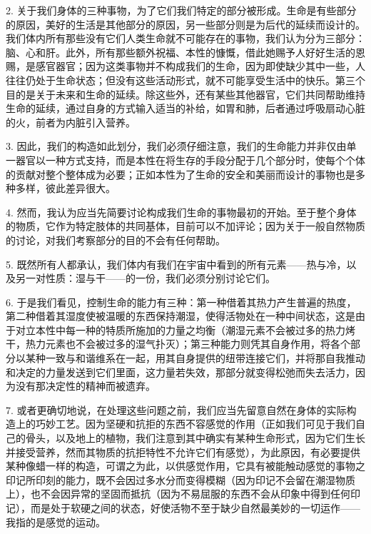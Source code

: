 2. 关于我们身体的三种事物，为了它们我们特定的部分被形成。生命是有些部分的原因，美好的生活是其他部分的原因，另一些部分则是为后代的延续而设计的。我们体内所有那些没有它们人类生命就不可能存在的事物，我们认为分为三部分：脑、心和肝。此外，所有那些额外祝福、本性的慷慨，借此她赐予人好好生活的恩赐，是感官器官；因为这类事物并不构成我们的生命，因为即使缺少其中一些，人往往仍处于生命状态；但没有这些活动形式，就不可能享受生活中的快乐。第三个目的是关于未来和生命的延续。除这些外，还有某些其他器官，它们共同帮助维持生命的延续，通过自身的方式输入适当的补给，如胃和肺，后者通过呼吸扇动心脏的火，前者为内脏引入营养。\par

3. 因此，我们的构造如此划分，我们必须仔细注意，我们的生命能力并非仅由单一器官以一种方式支持，而是本性在将生存的手段分配于几个部分时，使每个个体的贡献对整个整体成为必要；正如本性为了生命的安全和美丽而设计的事物也是多种多样，彼此差异很大。\par

4. 然而，我认为应当先简要讨论构成我们生命的事物最初的开始。至于整个身体的物质，它作为特定肢体的共同基体，目前可以不加评论；因为关于一般自然物质的讨论，对我们考察部分的目的不会有任何帮助。\par

5. 既然所有人都承认，我们体内有我们在宇宙中看到的所有元素——热与冷，以及另一对性质：湿与干——的一份，我们必须分别讨论它们。\par

6. 于是我们看见，控制生命的能力有三种：第一种借着其热力产生普遍的热度，第二种借着其湿度使被温暖的东西保持潮湿，使得活物处在一种中间状态，这是由于对立本性中每一种的特质所施加的力量之均衡（潮湿元素不会被过多的热力烤干，热力元素也不会被过多的湿气扑灭）；第三种能力则凭其自身作用，将各个部分以某种一致与和谐维系在一起，用其自身提供的纽带连接它们，并将那自我推动和决定的力量发送到它们里面，这力量若失效，那部分就变得松弛而失去活力，因为没有那决定性的精神而被遗弃。\par

7. 或者更确切地说，在处理这些问题之前，我们应当先留意自然在身体的实际构造上的巧妙工艺。因为坚硬和抗拒的东西不容感觉的作用（正如我们可见于我们自己的骨头，以及地上的植物，我们注意到其中确实有某种生命形式，因为它们生长并接受营养，然而其物质的抗拒特性不允许它们有感觉），为此原因，有必要提供某种像蜡一样的构造，可谓之为此，以供感觉作用，它具有被能触动感觉的事物之印记所印刻的能力，既不会因过多水分而变得模糊（因为印记不会留在潮湿物质上），也不会因异常的坚固而抵抗（因为不易屈服的东西不会从印象中得到任何印记），而是处于软硬之间的状态，好使活物不至于缺少自然最美妙的一切运作——我指的是感觉的运动。\par

